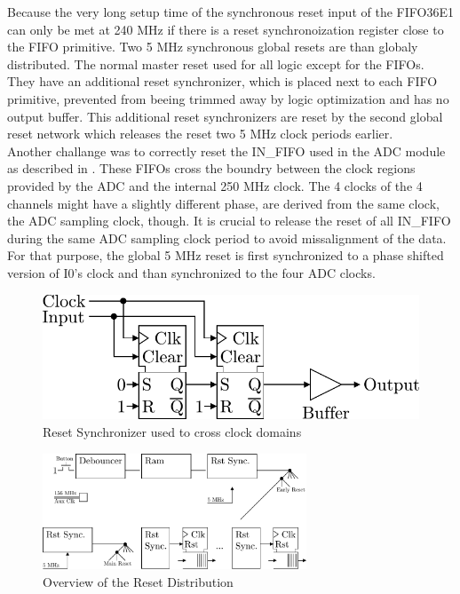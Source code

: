Because the very long setup time of the synchronous reset input of the FIFO36E1
can only be met at 240 MHz if there is a reset synchronoization register
close to the FIFO primitive. Two 5 MHz synchronous global resets are than
globaly distributed. The normal master reset used for all logic except
for the FIFOs. They have an additional reset synchronizer, which is
placed next to each FIFO primitive, prevented from beeing trimmed
away by logic optimization and has no output buffer.
This additional reset synchronizers are reset by the second global reset network
which releases the reset two 5 MHz clock periods earlier.  \\

Another challange was to correctly reset the IN\_FIFO used in the
\gls{ADC} module as described in . These \glspl{FIFO}
cross the boundry between the clock regions provided by the \gls{ADC} and
the internal 250 MHz clock. The 4 clocks of the 4 channels might
have a slightly different phase, are derived from the same clock, the
\gls{ADC} sampling clock, though. It is crucial to release the reset
of all IN\_FIFO during the same \gls{ADC} sampling clock period to avoid
missalignment of the data. For that purpose, the global 5 MHz
reset is first synchronized to a phase shifted version of I0's clock and
than synchronized to the four \gls{ADC} clocks. \\

\begin{figure}
  \centering
  \includegraphics{figures/RstSync}
  \caption{Reset Synchronizer used to cross clock domains}
  \label{fig:fpga_rst_sync}
\end{figure}

\begin{figure}
  \centering
  \includegraphics[width=0.7\textwidth]{figures/rst_generation}
  \caption{Overview of the Reset Distribution}
  \label{fig:fpga_rst_generation}
\end{figure}

